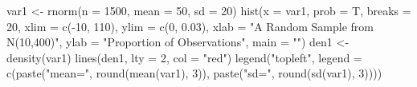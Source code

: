 \begin{Schunk}
\begin{Sinput}
 var1 <- rnorm(n = 1500, mean = 50, sd = 20)
 hist(x = var1, prob = T, breaks = 20, xlim = c(-10, 
     110), ylim = c(0, 0.03), xlab = "A Random Sample from N(10,400)", 
     ylab = "Proportion of Observations", main = "")
 den1 <- density(var1)
 lines(den1, lty = 2, col = "red")
 legend("topleft", legend = c(paste("mean=", 
     round(mean(var1), 3)), paste("sd=", round(sd(var1), 
     3))))
\end{Sinput}
\end{Schunk}
